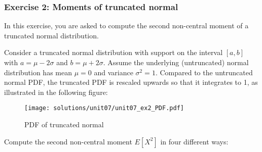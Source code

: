 \documentclass{scrartcl}
\begin{document}
    \hypertarget{exercise-2-moments-of-truncated-normal}{%
\subsubsection{Exercise 2: Moments of truncated
normal}\label{exercise-2-moments-of-truncated-normal}}

In this exercise, you are asked to compute the second non-central moment
of a truncated normal distribution.

Consider a truncated normal distribution with support on the interval
\([a,b]\) with \(a = \mu-2\sigma\) and \(b=\mu+2\sigma\). Assume the
underlying (untruncated) normal distribution has mean \(\mu = 0\) and
variance \(\sigma^2 = 1\). Compared to the untruncated normal PDF, the
truncated PDF is rescaled upwards so that it integrates to 1, as
illustrated in the following figure:

\begin{figure}
\centering
\texttt{[image: solutions/unit07/unit07\_ex2\_PDF.pdf]}
\caption{PDF of truncated normal}
\end{figure}

Compute the second non-central moment \(E[X^2]\) in four different ways:
\end{document}

